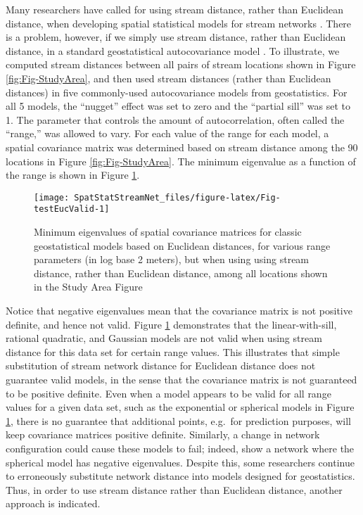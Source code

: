 \documentclass[]{book}
\theoremstyle{definition}
\theoremstyle{definition}
\theoremstyle{definition}
\theoremstyle{remark}
\begin{document}
Many researchers have called for using stream distance, rather than
Euclidean distance, when developing spatial statistical models for
stream networks
\citep{Dent:Grim:spat:1999, Torg:Gres:Bate:patt:2004, Yuan:usin:2004}.
There is a problem, however, if we simply use stream distance, rather
than Euclidean distance, in a standard geostatistical autocovariance
model \citep[e.g., a large number geostatistical models based on
Euclidean distance can be found in][p.~80--97]{Chil:Delf:geos:1999}. To
illustrate, we computed stream distances between all pairs of stream
locations shown in Figure \ref{fig:Fig-StudyArea}, and then used stream
distances (rather than Euclidean distances) in five commonly-used
autocovariance models from geostatistics. For all 5 models, the
``nugget'' effect was set to zero and the ``partial sill'' was set to 1.
The parameter that controls the amount of autocorrelation, often called
the ``range,'' was allowed to vary. For each value of the range for each
model, a spatial covariance matrix was determined based on stream
distance among the 90 locations in Figure \ref{fig:Fig-StudyArea}. The
minimum eigenvalue as a function of the range is shown in Figure
\ref{fig:Fig-testEucValid}.

\begin{figure}[h]

{\centering \texttt{[image: SpatStatStreamNet\_files/figure-latex/Fig-testEucValid-1]} 

}

\caption{Minimum eigenvalues of spatial covariance matrices for classic geostatistical models based on Euclidean distances, for various range parameters (in log base 2 meters), but when using using stream distance, rather than Euclidean distance, among all locations shown in the Study Area Figure}\label{fig:Fig-testEucValid}
\end{figure}

Notice that negative eigenvalues mean that the covariance matrix is not
positive definite, and hence not valid. Figure
\ref{fig:Fig-testEucValid} demonstrates that the linear-with-sill,
rational quadratic, and Gaussian models are not valid when using stream
distance for this data set for certain range values. This illustrates
that simple substitution of stream network distance for Euclidean
distance does not guarantee valid models, in the sense that the
covariance matrix is not guaranteed to be positive definite. Even when a
model appears to be valid for all range values for a given data set,
such as the exponential or spherical models in Figure
\ref{fig:Fig-testEucValid}, there is no guarantee that additional
points, e.g.~for prediction purposes, will keep covariance matrices
positive definite. Similarly, a change in network configuration could
cause these models to fail; indeed, \citet{Ver:Pete:Theo:spat:2006} show
a network where the spherical model has negative eigenvalues. Despite
this, some researchers continue to erroneously substitute network
distance into models designed for geostatistics. Thus, in order to use
stream distance rather than Euclidean distance, another approach is
indicated.
\end{document}
